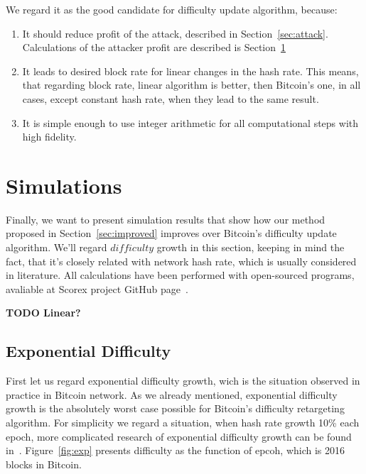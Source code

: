 \documentclass[number,preprint,review]{elsarticle}
\begin{document}
We regard it as the good candidate for difficulty update algorithm, because:
\begin{enumerate}
\item{It should reduce profit of the attack, described in Section~\ref{sec:attack}.
Calculations of the attacker profit are described is Section~\ref{sec:sim}}
\item{It leads to desired block rate for linear changes in the hash rate.
This means, that regarding block rate, linear algorithm is better, then Bitcoin's one, in all cases, except constant hash rate, when they lead to the same result. }
\item{It is simple enough to use integer arithmetic for all computational steps with high fidelity.}
\end{enumerate}

\section{Simulations}
\label{sec:sim}

Finally, we want to present simulation results that show how our method proposed in Section~\ref{sec:improved} improves over Bitcoin’s difficulty update algorithm.
We'll regard \(difficulty\) growth in this section, keeping in mind the fact, that it's closely related with network hash rate, which is usually considered in literature.
All calculations have been performed with open-sourced programs, avaliable at Scorex project GitHub page~\cite{scorex}.

\textbf{TODO Linear?}

\subsection{Exponential Difficulty}

First let us regard exponential difficulty growth, wich is the situation observed in practice in Bitcoin network.
As we already mentioned, exponential difficulty growth is the absolutely worst case possible for Bitcoin’s difficulty retargeting algorithm.
For simplicity we regard a situation, when hash rate growth 10\% each epoch, more complicated research of exponential difficulty growth can be found in~\cite{kraft2015difficulty}.
Figure~\ref{fig:exp} presents difficulty as the function of epcoh, which is 2016 blocks in Bitcoin.
\end{document}
